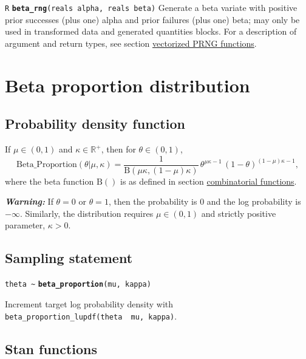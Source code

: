 \documentclass[
  10pt,
]{book}
\begin{document}
\texttt{R} \textbf{\texttt{beta\_rng}}\texttt{(reals\ alpha,\ reals\ beta)}\newline
Generate a beta variate with positive prior successes (plus one) alpha
and prior failures (plus one) beta; may only be used in transformed data and
generated quantities blocks. For a description of argument and return types, see
section \protect\hyperlink{prng-vectorization}{vectorized PRNG functions}.

\hypertarget{beta-proportion-distribution}{%
\section{Beta proportion distribution}\label{beta-proportion-distribution}}

\hypertarget{probability-density-function-22}{%
\subsection{Probability density function}\label{probability-density-function-22}}

If \(\mu \in (0, 1)\) and \(\kappa \in \mathbb{R}^+\), then for \(\theta \in (0,1)\), \[ \mathrm{Beta\_Proportion}(\theta|\mu,\kappa) =
\frac{1}{\mathrm{B}(\mu \kappa, (1 - \mu) \kappa)} \,
\theta^{\mu\kappa - 1} \, (1 - \theta)^{(1 - \mu)\kappa- 1} , \] where
the beta function \(\mathrm{B}()\) is as defined in section
\protect\hyperlink{betafun}{combinatorial functions}.

\emph{\textbf{Warning:}} If \(\theta = 0\) or \(\theta = 1\), then the probability
is 0 and the log probability is \(-\infty\). Similarly, the
distribution requires \(\mu \in (0, 1)\) and strictly positive
parameter, \(\kappa > 0\).

\hypertarget{sampling-statement-46}{%
\subsection{Sampling statement}\label{sampling-statement-46}}

\texttt{theta\ \textasciitilde{}} \textbf{\texttt{beta\_proportion}}\texttt{(mu,\ kappa)}

Increment target log probability density with \texttt{beta\_proportion\_lupdf(theta\ \textbar{}\ mu,\ kappa)}.

\hypertarget{stan-functions-45}{%
\subsection{Stan functions}\label{stan-functions-45}}
\end{document}
